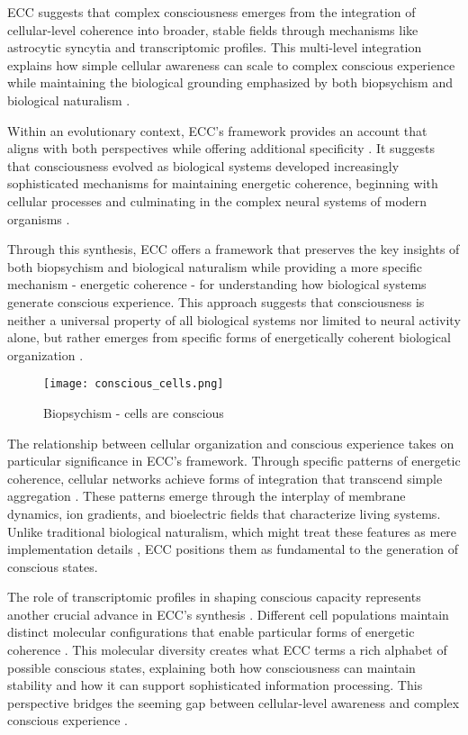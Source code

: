 ECC suggests that complex consciousness emerges from the integration of cellular-level coherence into broader, stable fields through mechanisms like astrocytic syncytia and transcriptomic profiles. This multi-level integration explains how simple cellular awareness can scale to complex conscious experience while maintaining the biological grounding emphasized by both biopsychism and biological naturalism \cite{godfrey2016other}.

Within an evolutionary context, ECC's framework provides an account that aligns with both perspectives while offering additional specificity \cite{varela1997patterns}. It suggests that consciousness evolved as biological systems developed increasingly sophisticated mechanisms for maintaining energetic coherence, beginning with cellular processes and culminating in the complex neural systems of modern organisms \cite{deacon2011incomplete}.

Through this synthesis, ECC offers a framework that preserves the key insights of both biopsychism and biological naturalism while providing a more specific mechanism - energetic coherence - for understanding how biological systems generate conscious experience. This approach suggests that consciousness is neither a universal property of all biological systems nor limited to neural activity alone, but rather emerges from specific forms of energetically coherent biological organization \cite{clark2010supersizing}.

\begin{figure}[h]
    \centering
    \texttt{[image: conscious\_cells.png]}

    \caption{Biopsychism - cells are conscious}
\end{figure}

The relationship between cellular organization and conscious experience takes on particular significance in ECC's framework. Through specific patterns of energetic coherence, cellular networks achieve forms of integration that transcend simple aggregation \cite{lyon2015cognitive}. These patterns emerge through the interplay of membrane dynamics, ion gradients, and bioelectric fields that characterize living systems. Unlike traditional biological naturalism, which might treat these features as mere implementation details \cite{searle2017biological}, ECC positions them as fundamental to the generation of conscious states.

The role of transcriptomic profiles in shaping conscious capacity represents another crucial advance in ECC's synthesis \cite{Tasic2018,Hawrylycz2012}. Different cell populations maintain distinct molecular configurations that enable particular forms of energetic coherence \cite{shapiro2007bacteria}. This molecular diversity creates what ECC terms a rich alphabet of possible conscious states, explaining both how consciousness can maintain stability and how it can support sophisticated information processing. This perspective bridges the seeming gap between cellular-level awareness and complex conscious experience \cite{van2006principles}.

